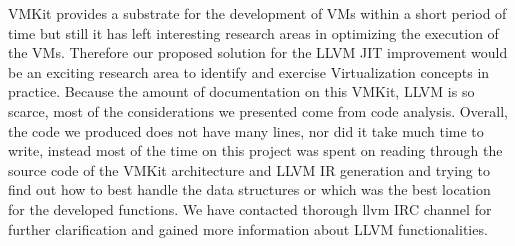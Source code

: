 \label{sec:conclusion}

VMKit provides a substrate for the development of VMs within a short period of time but still it has left interesting research areas in optimizing the execution of the VMs. Therefore our proposed solution for the LLVM JIT improvement would be an exciting research area to identify and exercise Virtualization concepts in practice.
Because the amount of documentation on this VMKit, LLVM is so scarce, most of the considerations we presented come from code analysis. Overall, the code we produced does not have many lines,
nor did it take much time to write, instead most of the time
on this project was spent on reading through the source code
 of the VMKit architecture and LLVM IR generation and trying to find out how to best handle
the data structures or which was the best location for the
 developed functions.  We have contacted thorough llvm IRC channel for further clarification and gained more information about LLVM functionalities.